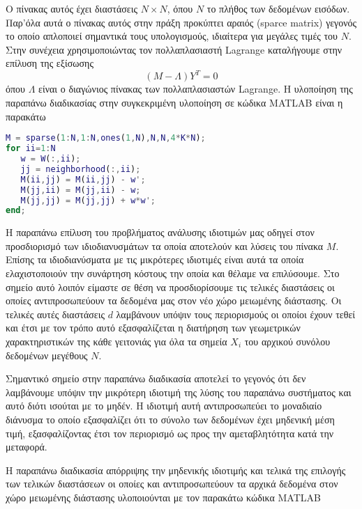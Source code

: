 Ο πίνακας αυτός έχει διαστάσεις $N \times N$, όπου $N$ το πλήθος των δεδομένων εισόδων. Παρ'όλα αυτά ο πίνακας αυτός στην πράξη προκύπτει αραιός \textlatin{(sparce matrix)} γεγονός το οποίο απλοποιεί σημαντικά τους υπολογισμούς, ιδιαίτερα για μεγάλες τιμές του $N$. Στην συνέχεια χρησιμοποιώντας τον πολλαπλασιαστή \textlatin{Lagrange} καταλήγουμε στην επίλυση της εξίσωσης
\begin{equation}
        (M-\Lambda)Y^{T} = 0
\end{equation}
\hspace*{\fill}\newline
όπου $\Lambda$ είναι ο διαγώνιος πίνακας των πολλαπλασιαστών \textlatin{Lagrange}. Η υλοποίηση της παραπάνω διαδικασίας στην συγκεκριμένη υλοποίηση σε κώδικα \textlatin{MATLAB} είναι η παρακάτω
\begin{lstlisting}[language=Matlab]
% M=eye(N,N); % use a sparse matrix with storage for 4KN nonzero elements
M = sparse(1:N,1:N,ones(1,N),N,N,4*K*N); 
for ii=1:N
   w = W(:,ii);
   jj = neighborhood(:,ii);
   M(ii,jj) = M(ii,jj) - w';
   M(jj,ii) = M(jj,ii) - w;
   M(jj,jj) = M(jj,jj) + w*w';
end;
\end{lstlisting}
\par
Η παραπάνω επίλυση του προβλήματος ανάλυσης ιδιοτιμών μας οδηγεί στον προσδιορισμό των ιδιοδιανυσμάτων τα οποία αποτελούν και λύσεις του πίνακα $M$. Επίσης τα ιδιοδιανύσματα με τις μικρότερες ιδιοτιμές είναι αυτά τα οποία ελαχιστοποιούν την συνάρτηση κόστους την οποία και θέλαμε να επιλύσουμε. Στο σημείο αυτό λοιπόν είμαστε σε θέση να προσδιορίσουμε τις τελικές διαστάσεις οι οποίες αντιπροσωπεύουν τα δεδομένα μας στον νέο χώρο μειωμένης διάστασης. Οι τελικές αυτές διαστάσεις $d$ λαμβάνουν υπόψιν τους περιορισμούς οι οποίοι έχουν τεθεί και έτσι με τον τρόπο αυτό εξασφαλίζεται η διατήρηση των γεωμετρικών χαρακτηριστικών της κάθε γειτονιάς για όλα τα σημεία $X_{i}$ του αρχικού συνόλου δεδομένων μεγέθους $N$. 
\par
Σημαντικό σημείο στην παραπάνω διαδικασία αποτελεί το γεγονός ότι δεν λαμβάνουμε υπόψιν την μικρότερη ιδιοτιμή της λύσης του παραπάνω συστήματος και αυτό διότι ισούται με το μηδέν. Η ιδιοτιμή αυτή αντιπροσωπεύει το μοναδιαίο διάνυσμα το οποίο εξασφαλίζει ότι το σύνολο των δεδομένων έχει μηδενική μέση τιμή, εξασφαλίζοντας έτσι τον περιορισμό ως προς την αμεταβλητότητα κατά την μεταφορά.
\par
Η παραπάνω διαδικασία απόρριψης την μηδενικής ιδιοτιμής και τελικά της επιλογής των τελικών διαστάσεων οι οποίες και αντιπροσωπεύουν τα αρχικά δεδομένα στον χώρο μειωμένης διάστασης υλοποιούνται με τον παρακάτω κώδικα \textlatin{MATLAB}
